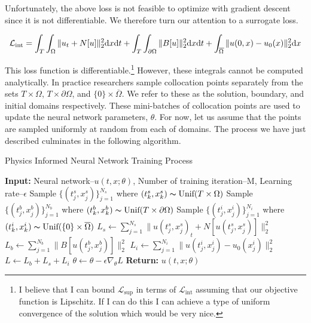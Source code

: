 \documentclass[12pt]{article}
\def\t{\text}
\begin{document}
\noindent Unfortunately, the above loss is not feasible to optimize with gradient descent since it is not differentiable. We therefore turn our attention to a surrogate loss.

\begin{equation}
    \mathcal{L_{\t{int}}} = \int_{T} \int_{\Omega} \| u_t + N[u] \|_2^2 \t dx \t dt + \int_{T} \int_{\partial \Omega} \|B[u] \|_2^2 \t dx \t dt + \int_{\overline{\Omega}} \|u(0,x) - u_0(x) \|_2^2 \t dx
\end{equation}

\noindent This loss function is differentiable.\footnote{I believe that I can bound $\mathcal{L}_{\t{sup}}$ in terms of $\mathcal{L}_{\t{int}}$ assuming that our objective function is Lipschitz. If I can do this I can achieve a type of uniform convergence of the solution which would be very nice.} However, these integrals cannot be computed analytically. In practice researchers sample collocation points separately from the sets $T \times \Omega$, $T \times \partial \Omega$, and $\{0\} \times \overline{\Omega}$. We refer to these as the solution, boundary, and initial domains respectively. These mini-batches of collocation points are used to update the neural network parameters, $\theta$. For now, let us assume that the points are sampled uniformly at random from each of domains. The process we have just described culminates in the following algorithm.

\begin{algorithm}
\caption{Physics Informed Neural Network Training Process}\label{alg:pinn}
\begin{algorithmic}
    \State \textbf{Input:} Neural network--$u(t,x;\theta)$, Number of training iteration--M, Learning rate--$\epsilon$
    \State Sample $\{(t^s_j,x^s_j)\}_{j=1}^{N_s}$ where $(t^s_k,x^s_k) \thicksim \t{Unif}(T \times \Omega)$ 
    \State Sample $\{(t^b_j,x^b_j)\}_{j=1}^{N_b}$ where $(t^b_k,x^b_k) \thicksim \t{Unif}(T \times \partial \Omega)$ 
    \State Sample $\{(t^i_j,x^i_j)\}_{j=1}^{N_i}$ where $(t^i_k,x^i_k) \thicksim \t{Unif}(\{0\} \times \overline{\Omega})$ 
    \State $L_s \gets \sum_{j=1}^{N_s} \| u(t^s_j,x^s_j)_t + N[u(t^s_j,x^s_j)] \|_2^2$
    \State $L_b \gets \sum_{j=1}^{N_b} \| B[u(t^b_j,x^b_j)] \|_2^2$
    \State $L_i \gets \sum_{j=1}^{N_i} \| u(t^i_j,x^i_j) - u_0(x^i_j) \|_2^2$
    \State $L \gets L_b + L_s + L_i$
    \State $\theta \gets \theta - \epsilon \nabla_{\theta} L$
    \EndFor
    \State \textbf{Return:} $u(t,x;\theta)$
\end{algorithmic}
\end{algorithm}
\end{document}
